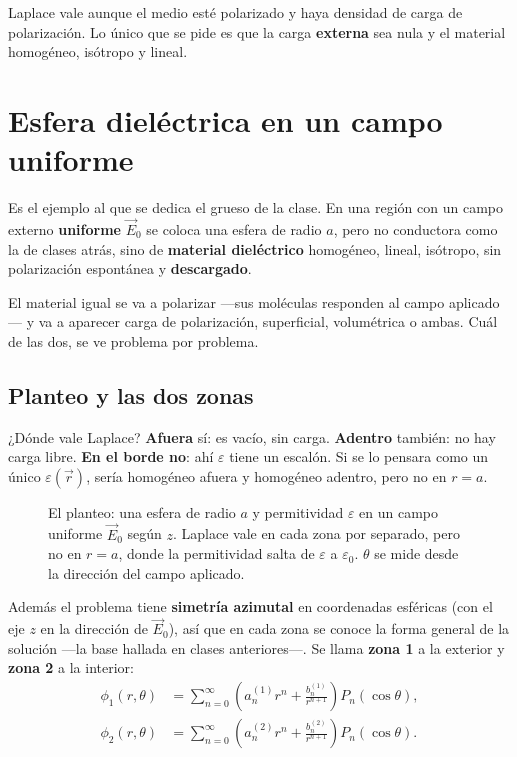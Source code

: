 \documentclass[12pt,a4paper]{article}
\begin{document}
\begin{notebox}[Lo interesante]
Laplace vale aunque el medio esté polarizado y haya densidad de carga de
polarización. Lo único que se pide es que la carga \textbf{externa} sea nula y el
material homogéneo, isótropo y lineal.
\end{notebox}

\section{Esfera dieléctrica en un campo uniforme}

Es el ejemplo al que se dedica el grueso de la clase. En una región con un campo
externo \textbf{uniforme} $\vec E_0$ se coloca una esfera de radio $a$, pero no
conductora como la de clases atrás, sino de \textbf{material dieléctrico}
homogéneo, lineal, isótropo, sin polarización espontánea y \textbf{descargado}.

\begin{notebox}
El material igual se va a polarizar ---sus moléculas responden al campo
aplicado--- y va a aparecer carga de polarización, superficial, volumétrica o
ambas. Cuál de las dos, se ve problema por problema.
\end{notebox}

\subsection{Planteo y las dos zonas}

¿Dónde vale Laplace? \textbf{Afuera} sí: es vacío, sin carga. \textbf{Adentro}
también: no hay carga libre. \textbf{En el borde no}: ahí $\varepsilon$ tiene un
escalón. Si se lo pensara como un único $\varepsilon(\vec r)$, sería homogéneo
afuera y homogéneo adentro, pero no en $r = a$.

\begin{figure}[H]
  \centering
  
  \caption{El planteo: una esfera de radio $a$ y permitividad $\varepsilon$ en un
  campo uniforme $\vec E_0$ según $z$. Laplace vale en cada zona por separado,
  pero no en $r=a$, donde la permitividad salta de $\varepsilon$ a
  $\varepsilon_0$. $\theta$ se mide desde la dirección del campo aplicado.}
\end{figure}

Además el problema tiene \textbf{simetría azimutal} en coordenadas esféricas (con
el eje $z$ en la dirección de $\vec E_0$), así que en cada zona se conoce la forma
general de la solución ---la base hallada en clases anteriores---. Se llama
\textbf{zona 1} a la exterior y \textbf{zona 2} a la interior:
\begin{align*}
\phi_1(r,\theta) &= \sum_{n=0}^{\infty}
\left(a_n^{(1)} r^n + \frac{b_n^{(1)}}{r^{n+1}}\right) P_n(\cos\theta),\\
\phi_2(r,\theta) &= \sum_{n=0}^{\infty}
\left(a_n^{(2)} r^n + \frac{b_n^{(2)}}{r^{n+1}}\right) P_n(\cos\theta).
\end{align*}
\end{document}
